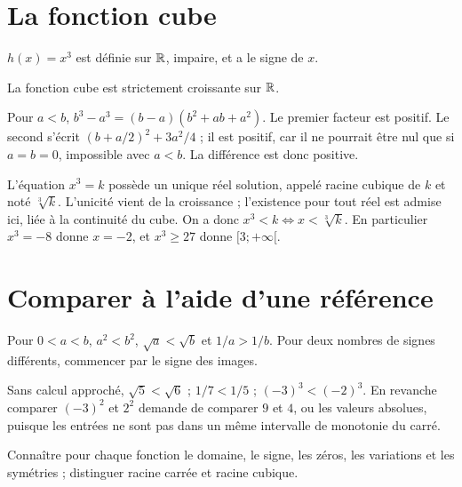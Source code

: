 \documentclass[../cours_2de.tex]{subfiles}
\begin{document}
\section{La fonction cube}
$h(x)=x^3$ est définie sur $\mathbb{R}$, impaire, et a le signe de $x$.
\begin{theoreme}
La fonction cube est strictement croissante sur $\mathbb{R}$.
\end{theoreme}
\begin{demonstration}
Pour $a<b$,
$b^3-a^3=(b-a)(b^2+ab+a^2)$.
Le premier facteur est positif. Le second s'écrit
$(b+a/2)^2+3a^2/4$ ; il est positif, car il ne pourrait être nul que si $a=b=0$, impossible avec $a<b$.
La différence est donc positive.
\end{demonstration}
L'équation $x^3=k$ possède un unique réel solution, appelé racine cubique de $k$ et noté $\sqrt[3]{k}$.
L'unicité vient de la croissance ; l'existence pour tout réel est admise ici, liée à la continuité du cube.
On a donc $x^3<k\Leftrightarrow x<\sqrt[3]{k}$.
En particulier $x^3=-8$ donne $x=-2$, et $x^3\geq27$ donne $[3;+\infty[$.
\begin{center}
\end{center}
\section{Comparer à l'aide d'une référence}
Pour $0<a<b$, $a^2<b^2$, $\sqrt a<\sqrt b$ et $1/a>1/b$.
Pour deux nombres de signes différents, commencer par le signe des images.
\begin{exemple}
Sans calcul approché, $\sqrt{5}<\sqrt{6}$ ; $1/7<1/5$ ; $(-3)^3<(-2)^3$.
En revanche comparer $(-3)^2$ et $2^2$ demande de comparer $9$ et $4$, ou les valeurs absolues, puisque les entrées ne sont pas dans un même intervalle de monotonie du carré.
\end{exemple}
\begin{retenir}
Connaître pour chaque fonction le domaine, le signe, les zéros, les variations et les symétries ; distinguer racine carrée et racine cubique.
\end{retenir}
\end{document}
